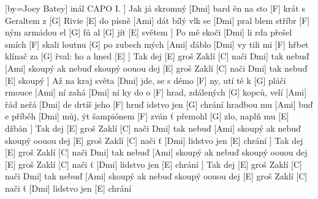 [by={Joey Batey}]
\freev
\chordsoff
inál CAPO I.
\cl
\chordsoff
\freev
] Jak já skromný [Dmi] bard
ěn na sto [F] krát
 s Geraltem z [G] Rivie
 [E] do písně [Ami] dát
\cl
\freev
 bílý vlk se [Dmi] pral
blem stříbr [F] ným
 armádou el [G] fů
al [G] jít [E] světem
\cl
\freev
] Po mě skoči [Dmi] li
rda přešel smích [F]
skali loutnu [G]
po zubech mých [Ami]
\cl
\freev
 ďáblo [Dmi] vy
tili mi [F] hřbet
klínač za [G] řval:
 ho a hned [E]
\cl
\freev
] Tak dej [E] groš Zaklí [C] nači
Dmi] tak nebuď [Ami] skoupý
ak nebuď skoupý oouou
dej [E] groš Zaklí [C] nači
Dmi] tak nebuď [E] skoupý
\cl
\freev
] Až na kraj světa [Dmi] jde,
se s démo [F] ny,
utí tě k [G] pláči
rmouce [Ami] ní
\cl
\freev
 zahá [Dmi] ní
ky do o [F] hrad,
zdálených [G] kopců,
velí [Ami] řád
\cl
\freev
 neřá [Dmi] de
drtíš jeho [F] hruď
idstvo jen [G] chrání
hradbou mu [Ami] buď
\cl
\freev
e příběh [Dmi] můj,
ýt šampiónem [F] zván
ť přemohl [G] zlo,
naplň mu [E] džbán
\cl
\freev
] Tak dej [E] groš Zaklí [C] nači
Dmi] tak nebuď [Ami] skoupý
ak nebuď skoupý oouou
dej [E] groš Zaklí [C] nači
ť [Dmi] lidstvo jen [E] chrání
\cl
\freev
] Tak dej [E] groš Zaklí [C] nači
Dmi] tak nebuď [Ami] skoupý
ak nebuď skoupý oouou
dej [E] groš Zaklí [C] nači
ť [Dmi] lidstvo jen [E] chrání
\cl
\freev
] Tak dej [E] groš Zaklí [C] nači
Dmi] tak nebuď [Ami] skoupý
ak nebuď skoupý oouou
dej [E] groš Zaklí [C] nači
ť [Dmi] lidstvo jen [E] chrání
\cl
\endsong


